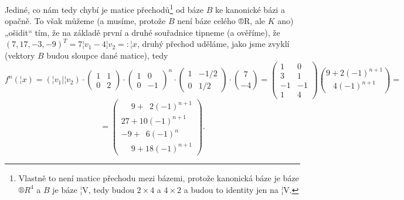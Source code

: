 \documentclass[10pt]{article}                   %
\begin{document}
\begin{priklad}[6.1]
\begin{reseni}
        Jediné, co nám tedy chybí je matice přechodů\footnote{Vlastně to není matice přechodu mezi bázemi, protože kanonická báze je báze $®R^4$ a $B$ je báze ¦V, tedy budou $2\times 4$ a $4\times 2$ a budou to identity jen na ¦V.} od báze $B$ ke kanonické bázi a opačně. To však můžeme (a musíme, protože $B$ není báze celého ®R, ale $K$ ano) „ošidit“ tím, že na základě první a druhé souřadnice tipneme (a ověříme), že $(7, 17, -3, -9)^T = 7¦v_1 - 4¦v_2 =: ¦x$, druhý přechod uděláme, jako jsme zvyklí (vektory $B$ budou sloupce dané matice), tedy
        $$ f^n(¦x) = (¦v_1 | ¦v_2)·\begin{pmatrix} 1 & 1 \\ 0 & 2 \end{pmatrix}·\begin{pmatrix} 1 & 0 \\ 0 & -1 \end{pmatrix}^n·\begin{pmatrix} 1 & -1/2 \\ 0 & 1/2 \end{pmatrix}·\binom{7}{-4} = \begin{pmatrix} 1 & 0 \\ 3 & 1 \\ -1 & -1 \\ 1 & 4 \end{pmatrix}\binom{9 + 2(-1)^{n+1}}{4(-1)^{n+1}} = $$
        $$ = \begin{pmatrix} \phantom{-}9 + \phantom{1}2(-1)^{n+1} \\ 27 + 10(-1)^{n+1} \\ -9 + \phantom{1}6(-1)^n\phantom{12} \\ \phantom{-}9 + 18(-1)^{n+1} \end{pmatrix}. $$ 
    \end{reseni}
\end{priklad}

\pagebreak
\end{document}
